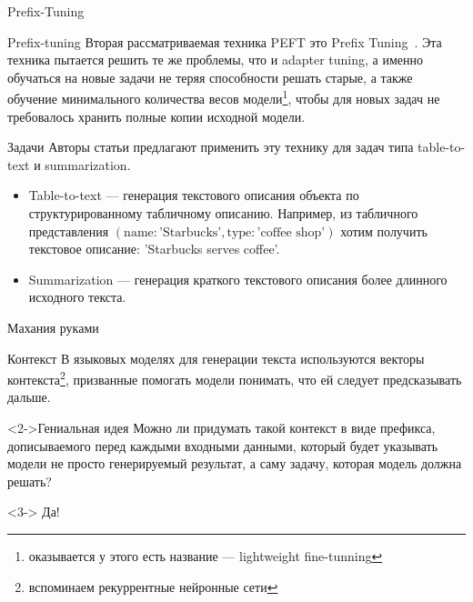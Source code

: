 \documentclass[9pt]{beamer}
\begin{document}
\begin{frame}{Prefix-Tuning}

    \begin{block}{Prefix-tuning}
        Вторая рассматриваемая техника PEFT это Prefix Tuning~\cite{prefix}. Эта техника пытается решить те же проблемы, что и adapter tuning, а именно обучаться на новые задачи не теряя способности решать старые, а также обучение минимального количества весов модели\footnote{оказывается у этого есть название --- lightweight fine-tunning}, чтобы для новых задач не требовалось хранить полные копии исходной модели.
    \end{block}

    \begin{block}{Задачи}
        Авторы статьи предлагают применить эту технику для задач типа table-to-text и summarization.

        \begin{itemize}
            \item Table-to-text --- генерация текстового описания объекта по структурированному табличному описанию. Например, из табличного представления $(\text{name}: \text{'Starbucks'}, \text{type}: \text{'coffee shop'})$ хотим получить текстовое описание: 'Starbucks serves coffee'.
            \item Summarization --- генерация краткого текстового описания более длинного исходного текста.
        \end{itemize}

    \end{block}

\end{frame}


\begin{frame}{Махания руками}

    \begin{block}{Контекст}
        В языковых моделях для генерации текста используются векторы контекста\footnote{вспоминаем рекуррентные нейронные сети}, призванные помогать модели понимать, что ей следует предсказывать дальше.
    \end{block}

    \begin{block}<2->{Гениальная идея}
        Можно ли придумать такой контекст в виде префикса, дописываемого перед каждыми входными данными, который будет указывать модели не просто генерируемый результат, а саму задачу, которая модель должна решать?

        \begin{solution}<3->
            Да!
        \end{solution}
    \end{block}

\end{frame}
\end{document}

